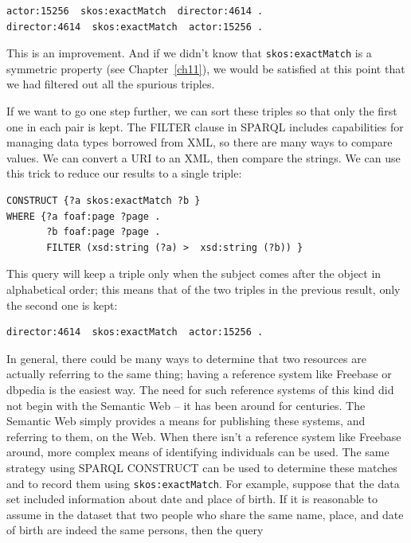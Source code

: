 \begin{challenge}
\begin{lstlisting}
actor:15256  skos:exactMatch  director:4614 .
director:4614  skos:exactMatch  actor:15256 .
\end{lstlisting}

This is an improvement. And if we didn't know that \texttt{skos:exactMatch} is a
symmetric property (see Chapter~\ref{ch11}), we would be satisfied at this point that we had filtered out all
the spurious triples.

If we want to go one step further, we can sort these triples so that
only the first one in each pair is kept. The FILTER clause in SPARQL
includes capabilities for managing data types borrowed from XML, so
there are many ways to compare values. We can convert a URI to an XML,
then compare the strings. We can use this trick to reduce our results to
a single triple:

\begin{lstlisting}
CONSTRUCT {?a skos:exactMatch ?b }
WHERE {?a foaf:page ?page .
       ?b foaf:page ?page .
       FILTER (xsd:string (?a) >  xsd:string (?b)) }
\end{lstlisting}


This query will keep a triple only when the subject comes after the
object in alphabetical order; this means that of the two triples in the
previous result, only the second one is kept:

\begin{lstlisting}
director:4614  skos:exactMatch  actor:15256 .
\end{lstlisting}

In general, there could be many ways to determine that two resources are
actually referring to the same thing; having a reference system like
Freebase or dbpedia is the easiest way. The need for such reference systems of this
kind did not begin with the Semantic Web -- it has been around for
centuries. The Semantic Web simply provides a means for publishing these
systems, and referring to them, on the Web. When there isn't a reference
system like Freebase around, more complex means of identifying
individuals can be used. The same strategy using SPARQL CONSTRUCT can be
used to determine these matches and to record them using
\texttt{skos:exactMatch}. For example, suppose that the data set included
information about date and place of birth. If it is reasonable to assume
in the dataset that two people who share the same name, place, and date
of birth are indeed the same persons, then the query


\end{challenge}
